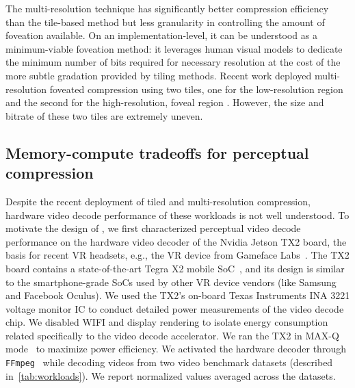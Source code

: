 The multi-resolution technique has significantly better compression efficiency than the tile-based method but less granularity in controlling the amount of foveation available.
On an implementation-level, it can be understood as a minimum-viable foveation method: it leverages human visual models to dedicate the minimum number of bits required for necessary resolution at the cost of the more subtle gradation provided by tiling methods.
Recent work deployed multi-resolution foveated compression using two tiles, one for the low-resolution region and the second for the high-resolution, foveal region \cite{google-foveation}.
However, the size and bitrate of these two tiles are extremely uneven.



\subsection{Memory-compute tradeoffs for perceptual compression}
Despite the recent deployment of tiled and multi-resolution compression, hardware video decode performance of these workloads is not well understood.
To motivate the design of \nameArch, we first characterized perceptual video decode performance on the hardware video decoder of the Nvidia Jetson TX2 board, the basis for recent VR headsets, e.g., the VR device from Gameface Labs~\cite{gameface}.
The TX2 board contains a state-of-the-art Tegra X2 mobile SoC~\cite{nvidia-jetson-tx2}, and its design is similar to the smartphone-grade SoCs used by other VR device vendors (like Samsung and Facebook Oculus).
We used the TX2's on-board Texas Instruments INA 3221 voltage monitor IC to conduct detailed power measurements of the video decode chip.
We disabled WIFI and display rendering to isolate energy consumption related specifically to the video decode accelerator.
We ran the TX2 in MAX-Q mode~\cite{nvidia-jetson-reference} to maximize power efficiency.
We activated the hardware decoder through \texttt{FFmpeg}~\cite{ffmpeg} while decoding videos from two video benchmark datasets (described in~\ref{tab:workloads}). We report normalized values averaged across the datasets.

\motivationComputeMemEnergyTime

